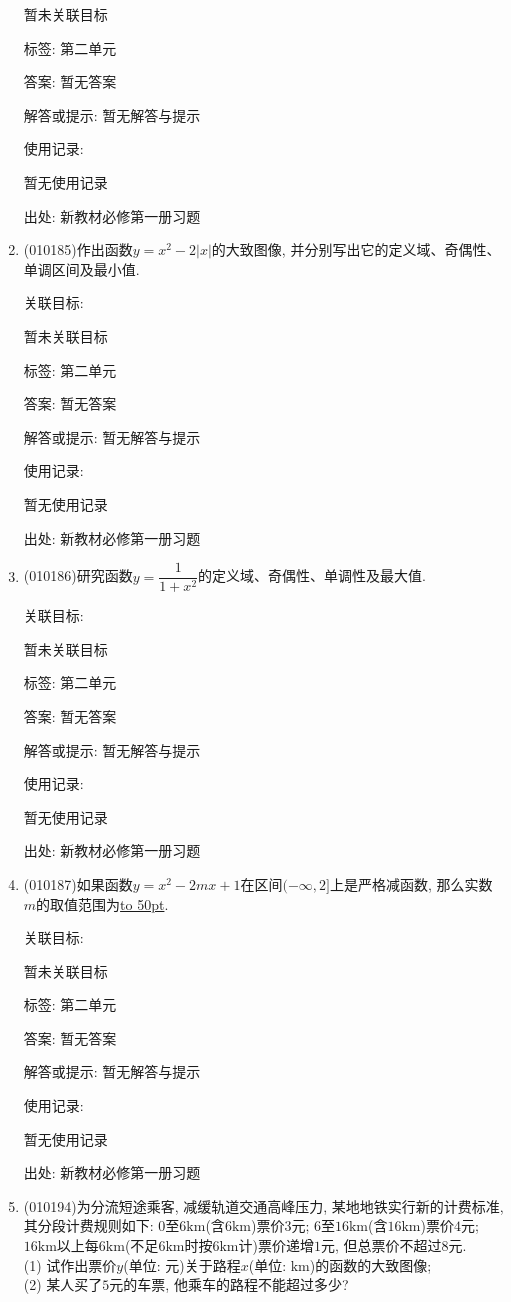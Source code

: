 \documentclass[10pt,a4paper]{article}
\newcommand{\blank}[1]{\underline{\hbox to #1pt{}}}
\begin{document}
\begin{enumerate}[1.]
暂未关联目标



标签: 第二单元

答案: 暂无答案

解答或提示: 暂无解答与提示

使用记录:

暂无使用记录


出处: 新教材必修第一册习题
\item { (010185)}作出函数$y=x^2-2|x|$的大致图像, 并分别写出它的定义域、奇偶性、单调区间及最小值.


关联目标:

暂未关联目标



标签: 第二单元

答案: 暂无答案

解答或提示: 暂无解答与提示

使用记录:

暂无使用记录


出处: 新教材必修第一册习题
\item { (010186)}研究函数$y=\dfrac1{1+x^2}$的定义域、奇偶性、单调性及最大值.


关联目标:

暂未关联目标



标签: 第二单元

答案: 暂无答案

解答或提示: 暂无解答与提示

使用记录:

暂无使用记录


出处: 新教材必修第一册习题
\item { (010187)}如果函数$y=x^2-2mx+1$在区间$(-\infty, 2]$上是严格减函数, 那么实数$m$的取值范围为\blank{50}.


关联目标:

暂未关联目标



标签: 第二单元

答案: 暂无答案

解答或提示: 暂无解答与提示

使用记录:

暂无使用记录


出处: 新教材必修第一册习题
\item { (010194)}为分流短途乘客, 减缓轨道交通高峰压力, 某地地铁实行新的计费标准, 其分段计费规则如下: $0$至$6\text{km}$(含$6\text{km}$)票价$3$元; $6$至$16\text{km}$(含$16\text{km}$)票价$4$元; $16\text{km}$以上每$6\text{km}$(不足$6\text{km}$时按$6\text{km}$计)票价递增$1$元, 但总票价不超过$8$元.\\
(1) 试作出票价$y$(单位: 元)关于路程$x$(单位: $\text{km}$)的函数的大致图像;\\
(2) 某人买了$5$元的车票, 他乘车的路程不能超过多少?



\end{enumerate}
\end{document}
